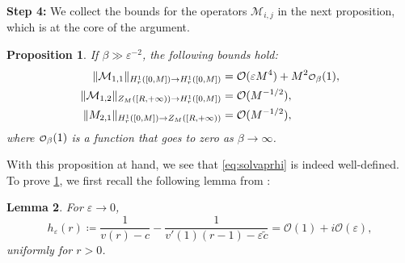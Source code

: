 \documentclass[11pt,reqno]{amsproc}
\def\eps{\varepsilon}
\newcommand{\cM}{\mathcal{M}}
\newcommand{\cO}{\mathcal{O}}
\newcommand\smallO{
  \mathchoice
    {{\scriptstyle\mathcal{O}}}%
    {{\scriptstyle\mathcal{O}}}%
    {{\scriptscriptstyle\mathcal{O}}}%
    {\scalebox{.7}{$\scriptscriptstyle\mathcal{O}$}}%
  }
\newtheorem{proposition}{Proposition}[section]
\newtheorem{lemma}[proposition]{Lemma}
\theoremstyle{definition}
\theoremstyle{definition}
\numberwithin{equation}{section}
\begin{document}
\medskip

\textbf{Step 4:} We collect the bounds for the operators $\cM_{i,j}$ in the next proposition, which is at the core of the argument. 
\begin{proposition}
\label{prop:boundsM}
If $\beta\gg \eps^{-2}$, the following bounds hold:
\begin{align}
\label{bd:M11}\| \cM_{1,1}\|_{H^1_r([0,M]) \rightarrow H^1_r([0,M])} & = \mathcal O(\varepsilon M^4)+M^2\smallO_\beta(1), \\
\| \cM_{1,2}\|_{Z_M([R, +\infty)) \rightarrow H^1_r([0,M])}& = \cO(M^{-1/2}),\\
\|\mathcal \cM_{2,1}\|_{H^1_r
([0,M]) \rightarrow Z_M([R,+\infty))} & = \cO(M^{-1/2}),
\end{align}
where $\smallO_\beta(1)$ is a function that goes to zero as $\beta\to \infty$.
\end{proposition}
With this proposition at hand, we see that \cref{eq:solvaprhi} is indeed well-defined.
To prove \cref{prop:boundsM}, we first recall the following lemma from \cite[Lemma 4]{kumar2023simple}:
\begin{lemma}
\label{lemma:approximation_denominator}
For $\eps \rightarrow 0$,
\begin{equation}
h_\eps(r) \coloneqq \frac{1}{v(r)-c}- \frac{1}{v'(1)(r-1)-\eps \tilde{c}} = \mathcal{O}(1) + i \mathcal{O}(\eps),
\end{equation}
uniformly for $r>0$.
\end{lemma}
\end{document}
